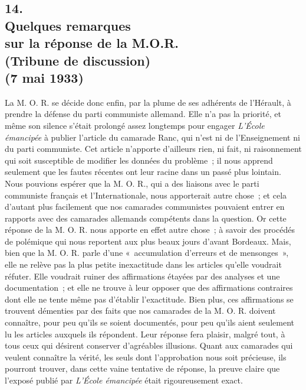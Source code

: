 \documentclass[french,twoside]{book} %
\begin{document}
\subsection[{14. Quelques remarques, sur la réponse de la M.O.R.  (Tribune de discussion) (7 mai 1933)}]{14. \\
Quelques remarques \\
sur la réponse de la M.O.R. \protect\footnotemark  \\
(Tribune de discussion) \\
(7 mai 1933)}
\noindent \par
La M. O. R. se décide donc enfin, par la plume de ses adhérents de l'Hérault, à prendre la défense du parti communiste allemand. Elle n'a pas la priorité, et même son silence s'était prolongé assez longtemps pour engager {\itshape L'École émancipée} à publier l'article du camarade Ranc, qui n'est ni de l'Ensei­gnement ni du parti communiste. Cet article n'apporte d'ailleurs rien, ni fait, ni raisonnement qui soit susceptible de modifier les données du problème ; il nous apprend seulement que les fautes récentes ont leur racine dans un passé plus lointain. Nous pouvions espérer que la M. O. R., qui a des liaisons avec le parti communiste français et l'Internationale, nous apporterait autre chose ; et cela d'autant plus facilement que nos camarades communistes pouvaient entrer en rapports avec des camarades allemands compétents dans la question. Or cette réponse de la M. O. R. nous apporte en effet autre chose ; à savoir des procédés de polémique qui nous reportent aux plus beaux jours d'avant Bordeaux. Mais, bien que la M. O. R. parle d'une « accumulation d'erreurs et de mensonges », elle ne relève pas la plus petite inexactitude dans les articles qu'elle voudrait réfuter. Elle voudrait ruiner des affirmations étayées par des analyses et une documentation ; et elle ne trouve à leur opposer que des affirmations contraires dont elle ne tente même pas d'établir l'exactitude. Bien plus, ces affirmations se trouvent démenties par des faits que nos camarades de la M. O. R. doivent connaître, pour peu qu'ils se soient documentés, pour peu qu'ils aient seulement lu les articles auxquels ils répondent. Leur réponse fera plaisir, malgré tout, à tous ceux qui désirent conserver d'agréables illusions. Quant aux camarades qui veulent connaître la vérité, les seuls dont l'approbation nous soit précieuse, ils pourront trouver, dans cette vaine tentative de réponse, la preuve claire que l'exposé publié par {\itshape L'École émanci­pée} était rigoureusement exact.\par
\end{document}
